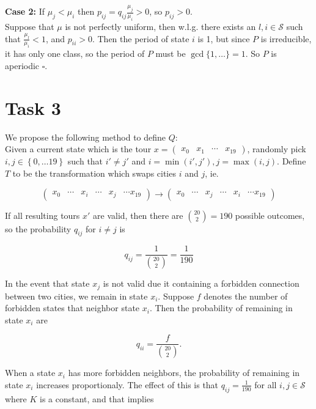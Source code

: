 \documentclass[6pt,oneside]{article}
\begin{document}
\textbf{Case 2:} If $\mu_j < \mu_i$ then $p_{ij} =  q_{ij}\frac{\mu_j}{\mu_i} > 0$, so
$p_{ij} > 0$.\\

Suppose that $\mu$ is not perfectly uniform, then w.l.g. there exists an $l,i\in\mathcal{S}$
such that $\frac{\mu_l}{\mu_i} < 1$, and $p_{ii} > 0$. Then the period of state $i$ is 1, but
since $P$ is irreducible, it has only one class, so the period of $P$ must be $\gcd\lbrace 1,\ldots\rbrace = 1$.
So $P$ is aperiodic $\square$.

\section*{Task 3}

We propose the following method to define $Q$:\\

Given a current state which is the tour $x=\begin{pmatrix} x_0 & x_1 & \cdots & x_{19} \end{pmatrix}$,
randomly pick $i, j \in \left\lbrace 0, \ldots 19\right\rbrace$ such that $i'\neq j'$ and
$i = \min(i',j'), j=\max( i, j)$. Define $T$ to be the transformation which swaps cities $i$ and $j$,
ie.

$$
\begin{pmatrix} x_0 & \cdots & x_i & \cdots & x_j & \cdots x_{19}\end{pmatrix}
\longrightarrow
\begin{pmatrix} x_0 & \cdots & x_j & \cdots & x_i & \cdots x_{19}\end{pmatrix}
$$

If all resulting tours $x'$ are valid, then there are $\binom{20}{2}=190$ possible
outcomes, so the probability $q_{ij}$ for $i\neq j$ is

$$
q_{ij} = \frac{1}{\binom{20}{2}} = \frac{1}{190}
$$

In the event that state $x_j$ is not valid due it containing a forbidden connection between two cities,
we remain in state $x_i$. Suppose $f$ denotes the number of forbidden states that neighbor state
$x_i$. Then the probability of remaining in state $x_i$ are

$$
q_{ii} = \frac{f}{\binom{20}{2}}.
$$

When a state $x_i$ has more forbidden neighbors, the probability of remaining in state $x_i$ increases
proportionaly. The effect of this is that $q_{ij} = \frac{1}{190}$ for all $i,j\in \mathcal{S}$ where $K$ is a constant,
and that implies
\end{document}
